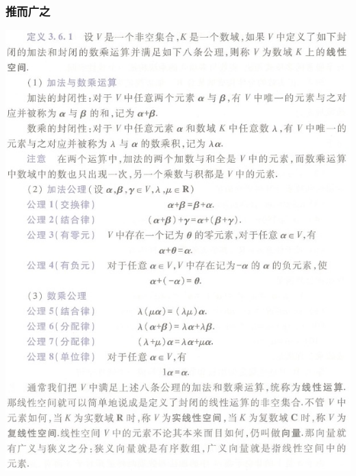 \documentclass[CJKutf8,xcolor=pdftex,dvipsnames,table]{beamer}
\begin{document}
\begin{CJK*}{UTF8}{song}
  \begin{frame}
    \frametitle{推而广之}
    \begin{center}
      \includegraphics[scale=.3]{cqu-la-def-3-6-1}
    \end{center}
  \end{frame}   


\end{CJK*}
\end{document}
